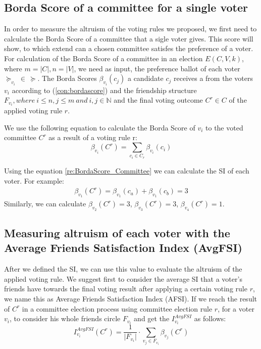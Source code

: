 \documentclass{article}
\begin{document}
\subsection{Borda Score of a committee for a single voter}
In order to measure the altruism of the voting rules we proposed, we first need to calculate the Borda Score of a committee that a sigle voter gives. This score will show, to which extend can a chosen committee satisfes the preference of a voter. 
For calculation of the Borda Score of a committee in an election $E(C,V,k)$,  where $m = \vert C \vert, n= \vert V \vert$, we need as input, the preference ballot of each voter $\succeq_{v_i} \, \in \, \succeq$.  The Borda Scores $\beta_{v_i}(c_j)$ a candidate $c_j$ receives a from the voters $v_i$ according to (\ref{con:bordascore}) and  the friendship structure $F_{v_i}, where  \: i\leqslant n, j\leqslant m  \:and \:i, j \in \mathbb{N}$ and  the final voting outcome $C^{r} \in C$ of the applied voting rule $r$.  

We use the following equation to calculate the Borda Score of $v_i$ to the voted committee $C^{r}$ as a result of a voting rule r:
\begin{equation}
    \beta_{v_i}(C^{r}) = \sum_{c_i\in {C_{r}}}\beta_{v_i}(c_i)
\label{re:BordaScore_Committee}
\end{equation}

Using the equation \ref{re:BordaScore_Committee} we can calculate the SI of each voter. For example: 
\begin{equation*}
\begin{split}
     \beta_{v_1}(C^{r}) =\beta_{v_1}(c_a) + \beta_{v_1}(c_b)= 3
\end{split}\end{equation*}
Similarly, we can calculate $ \beta_{v_2}(C^{r}) = 3$, $ \beta_{v_3}(C^{r})=3$, $ \beta_{v_4}(C^{r})=1$. 

\subsection{Measuring altruism of each voter with the Average Friends Satisfaction Index (AvgFSI)}
After we defined the SI, we can use this value to evaluate the altruism of the applied voting rule. We suggest first to consider the average SI that a voter's friends have towards the final voting result after applying a certain voting rule $r$, we name this as Average Friends Satisfaction Index (AFSI). If we reach the result of $C^{r}$ in a committee election process using committee election rule $r$, for a voter $v_i$, to consider his whole friends circle $F_{v_i}$ and get the $I_{v_i}^{AvgFSI}$ as follows:  
\begin{equation}
     I_{v_i}^{AvgFSI}(C^{r}) = \frac{1}{\vert F_{v_i} \vert}\cdot \sum_{v_j\in {F_{v_i}}}  \beta_{v_j}(C^{r})   \label{si:AvgFSI}
\end{equation}
\end{document}
